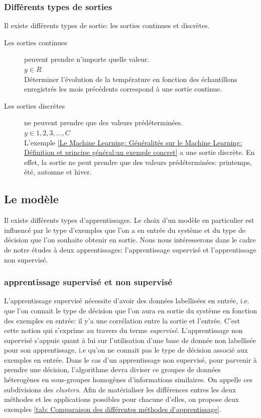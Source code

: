 \subsubsection{Différents types de sorties}
Il existe différents types de sortie: les sorties continues et discrètes.

\begin{description}
	\item [Les sorties continues] peuvent prendre n'importe quelle valeur. \\
	 $y \in R$ \\
	 Déterminer l'évolution de la température en fonction des échantillons enregistrés les mois précédents correspond à une sortie continue.
	\item [Les sorties discrètes] ne peuvent prendre que des valeurs prédéterminées. \\
	 $y \in {1, 2, 3, ...,C}$ \\
	 L'exemple \ref{Le Machine Learning: Généralités sur le Machine Learning: Définition et principe général:un exemple concret} a une sortie discrète. En effet, la sortie ne peut prendre que des valeurs prédéterminées: printemps, été, automne et hiver.
\end{description}



\subsection{Le modèle}
\label{Le Machine Learning: Généralités sur le Machine Learning: Le modèle}
Il existe différents types d'apprentissages. Le choix d'un modèle en particulier est influencé par le type d'exemples que l'on a en entrée du système et du type de décision que l'on souhaite obtenir en sortie. Nous nous intéresserons dans le cadre de notre études à deux apprentissages: l'apprentissage supervisé et l'apprentissage non supervisé.

\subsubsection{apprentissage supervisé et non supervisé} 
\label{Le Machine Learning: Généralités sur le Machine Learning: Le modèle: Apprentissage supervisé}
L'apprentissage supervisé nécessite d'avoir des données labellisées en entrée, i.e. que l'on connait le type de décision que l'on aura en sortie du système en fonction des exemples en entrée: il y'a une corrélation entre la sortie et l'entrée. C'est cette notion qui s'exprime au travers du terme \emph{supervisé}. 
L'apprentissage non supervisé s'appuie quant à lui sur l'utilisation d'une base de donnée non labellisée pour son apprentissage, i.e qu'on ne connait pas le type de décision associé aux exemples en entrée. Dans le cas d'un apprentissage non supervisé, pour parvenir à prendre une décision, l'algorithme devra diviser ce groupes de données héterogènes en sous-groupes homogènes d'informations similaires. On appelle ces subdivisions des \emph{clusters}.
Afin de matérialiser les différences entres les deux méthodes et les applications possibles pour chacune d'elles, on propose deux exemples \ref {tab: Comparaison des différentes méthodes d'apprentissage}.

